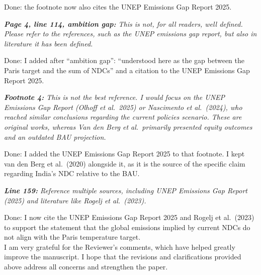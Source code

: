 \documentclass[11pt]{article}
\newenvironment{italic}{\itshape}{\par}
\begin{document}
Done: the footnote now also cites the UNEP Emissions Gap Report 2025.



\begin{italic}
\textbf{Page 4, line 114, ambition gap:} This is not, for all readers, well defined. Please refer to the references, such as the UNEP emissions gap report, but also in literature it has been defined.
\end{italic}

Done: I added after ``ambition gap'': ``understood here as the gap between the Paris target and the sum of NDCs'' and a citation to the UNEP Emissions Gap Report 2025.




\begin{italic}
\textbf{Footnote 4:} This is not the best reference. I would focus on the UNEP Emissions Gap Report (Olhoff et al.\ 2025) or Nascimento et al.\ (2024), who reached similar conclusions regarding the current policies scenario. These are original works, whereas Van den Berg et al.\ primarily presented equity outcomes and an outdated BAU projection.
\end{italic}


Done: I added the UNEP Emissions Gap Report 2025 to that footnote. I kept van den Berg et al.\ (2020) alongside it, as it is the source of the specific claim regarding India's NDC relative to the BAU.



\begin{italic}
\textbf{Line 159:} Reference multiple sources, including UNEP Emissions Gap Report (2025) and literature like Rogelj et al.\ (2023).
\end{italic}

Done: I now cite the UNEP Emissions Gap Report 2025 and Rogelj et al.\ (2023) to support the statement that the global emissions implied by current NDCs do not align with the Paris temperature target.
\\

I am very grateful for the Reviewer's comments, which have helped greatly improve the manuscript. I hope that the revisions and clarifications provided above address all concerns and strengthen the paper.
\end{document}
